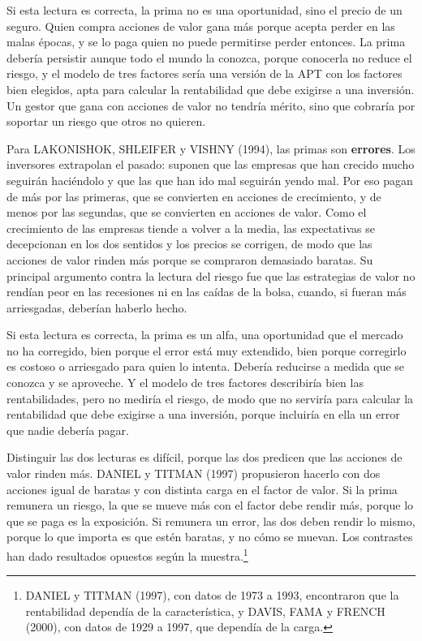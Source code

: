 \documentclass[10pt,a4paper]{article}
\begin{document}
Si esta lectura es correcta, la prima no es una oportunidad, sino el precio de un seguro. Quien compra acciones de valor gana más porque acepta perder en las malas épocas, y se lo paga quien no puede permitirse perder entonces. La prima debería persistir aunque todo el mundo la conozca, porque conocerla no reduce el riesgo, y el modelo de tres factores sería una versión de la APT con los factores bien elegidos, apta para calcular la rentabilidad que debe exigirse a una inversión. Un gestor que gana con acciones de valor no tendría mérito, sino que cobraría por soportar un riesgo que otros no quieren.

Para LAKONISHOK, SHLEIFER y VISHNY (1994), las primas son \textbf{errores}. Los inversores extrapolan el pasado: suponen que las empresas que han crecido mucho seguirán haciéndolo y que las que han ido mal seguirán yendo mal. Por eso pagan de más por las primeras, que se convierten en acciones de crecimiento, y de menos por las segundas, que se convierten en acciones de valor. Como el crecimiento de las empresas tiende a volver a la media, las expectativas se decepcionan en los dos sentidos y los precios se corrigen, de modo que las acciones de valor rinden más porque se compraron demasiado baratas. Su principal argumento contra la lectura del riesgo fue que las estrategias de valor no rendían peor en las recesiones ni en las caídas de la bolsa, cuando, si fueran más arriesgadas, deberían haberlo hecho.

Si esta lectura es correcta, la prima es un alfa, una oportunidad que el mercado no ha corregido, bien porque el error está muy extendido, bien porque corregirlo es costoso o arriesgado para quien lo intenta. Debería reducirse a medida que se conozca y se aproveche. Y el modelo de tres factores describiría bien las rentabilidades, pero no mediría el riesgo, de modo que no serviría para calcular la rentabilidad que debe exigirse a una inversión, porque incluiría en ella un error que nadie debería pagar.

Distinguir las dos lecturas es difícil, porque las dos predicen que las acciones de valor rinden más. DANIEL y TITMAN (1997) propusieron hacerlo con dos acciones igual de baratas y con distinta carga en el factor de valor. Si la prima remunera un riesgo, la que se mueve más con el factor debe rendir más, porque lo que se paga es la exposición. Si remunera un error, las dos deben rendir lo mismo, porque lo que importa es que estén baratas, y no cómo se muevan. Los contrastes han dado resultados opuestos según la muestra.\footnote{%
    DANIEL y TITMAN (1997), con datos de 1973 a 1993, encontraron que la rentabilidad dependía de la característica, y DAVIS, FAMA y FRENCH (2000), con datos de 1929 a 1997, que dependía de la carga.
}
\end{document}
